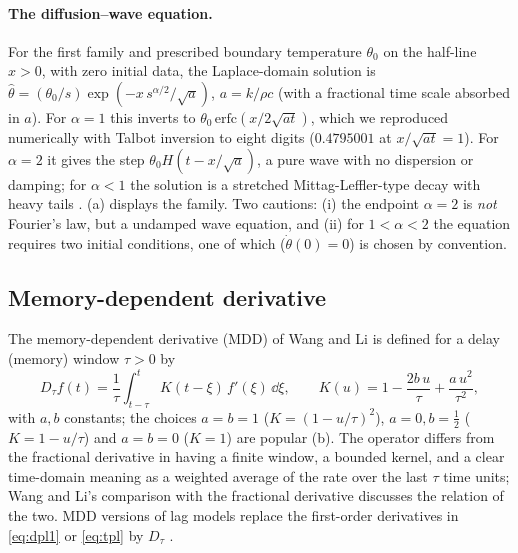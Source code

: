 \paragraph{The diffusion--wave equation.} For the first family and prescribed boundary temperature $\theta_0$ on the half-line $x>0$, with zero initial data, the Laplace-domain solution is $\hat\theta=(\theta_0/s)\exp(-x\,s^{\alpha/2}/\sqrt{a})$, $a=k/\rho c$ (with a fractional time scale absorbed in $a$). For $\alpha=1$ this inverts to $\theta_0\,\mathrm{erfc}(x/2\sqrt{at})$, which we reproduced numerically with Talbot inversion to eight digits ($0.4795001$ at $x/\sqrt{at}=1$). For $\alpha=2$ it gives the step $\theta_0H(t-x/\sqrt a)$, a pure wave with no dispersion or damping; for $\alpha<1$ the solution is a stretched Mittag-Leffler-type decay with heavy tails \citep{GorenfloKilbasMainardiRogosin2014,Luchko2010}. (a) displays the family. Two cautions: (i) the endpoint $\alpha=2$ is \emph{not} Fourier's law, but a undamped wave equation, and (ii) for $1<\alpha<2$ the equation requires two initial conditions, one of which ($\dot\theta(0)=0$) is chosen by convention.

\subsection{Memory-dependent derivative}
The memory-dependent derivative (MDD) of Wang and Li \citep{Wang2011} is defined for a delay (memory) window $\tau>0$ by
\begin{equation}
D_\tau f(t)=\frac1\tau\int_{t-\tau}^{t}K(t-\xi)\,f'(\xi)\,\dd\xi,\qquad K(u)=1-\frac{2b\,u}{\tau}+\frac{a\,u^2}{\tau^2},\label{eq:mdd}
\end{equation}
with $a,b$ constants; the choices $a=b=1$ ($K=(1-u/\tau)^2$), $a=0,b=\tfrac12$ ($K=1-u/\tau$) and $a=b=0$ ($K=1$) are popular (b). The operator differs from the fractional derivative in having a finite window, a bounded kernel, and a clear time-domain meaning as a weighted average of the rate over the last $\tau$ time units; Wang and Li's comparison with the fractional derivative \citep{Wang2021,WangLi2025IV} discusses the relation of the two. MDD versions of lag models replace the first-order derivatives in \eqref{eq:dpl1} or \eqref{eq:tpl} by $D_\tau$ \citep{Singh2019,Singh2020a,Biswas2019,Abouelregal2023,Sur2019,Sur2025,Hamza2014,Sur2012,Yu2014,Sherief2018,Ezzat2015}.

